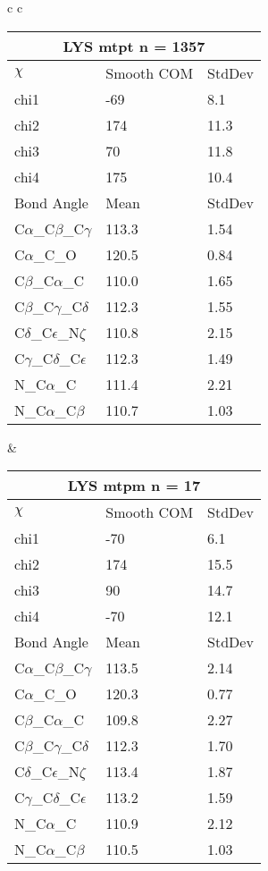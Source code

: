 \begin{longtable}{ c c }
  \begin{tabular}{ l l l }
  \toprule
  \multicolumn{3}{c}{LYS \textbf{mtpt} n = 1357} \\ \toprule
  $\chi$       & Smooth COM & StdDev \\ \midrule
  chi1 & -69 & 8.1 \\ 
  chi2 & 174 & 11.3 \\ 
  chi3 & 70 & 11.8 \\ 
  chi4 & 175 & 10.4 \\ \midrule
  Bond Angle   & Mean     & StdDev \\ \midrule
  C$\alpha$\_C$\beta$\_C$\gamma$ & 113.3 & 1.54\\
  C$\alpha$\_C\_O & 120.5 & 0.84\\
  C$\beta$\_C$\alpha$\_C & 110.0 & 1.65\\
  C$\beta$\_C$\gamma$\_C$\delta$ & 112.3 & 1.55\\
  C$\delta$\_C$\epsilon$\_N$\zeta$ & 110.8 & 2.15\\
  C$\gamma$\_C$\delta$\_C$\epsilon$ & 112.3 & 1.49\\
  N\_C$\alpha$\_C & 111.4 & 2.21\\
  N\_C$\alpha$\_C$\beta$ & 110.7 & 1.03\\
  \bottomrule
  \end{tabular}
  &
  \begin{tabular}{ l l l }
  \toprule
  \multicolumn{3}{c}{LYS \textbf{mtpm} n = 17} \\ \toprule
  $\chi$       & Smooth COM & StdDev \\ \midrule
  chi1 & -70 & 6.1 \\ 
  chi2 & 174 & 15.5 \\ 
  chi3 & 90 & 14.7 \\ 
  chi4 & -70 & 12.1 \\ \midrule
  Bond Angle   & Mean     & StdDev \\ \midrule
  C$\alpha$\_C$\beta$\_C$\gamma$ & 113.5 & 2.14\\
  C$\alpha$\_C\_O & 120.3 & 0.77\\
  C$\beta$\_C$\alpha$\_C & 109.8 & 2.27\\
  C$\beta$\_C$\gamma$\_C$\delta$ & 112.3 & 1.70\\
  C$\delta$\_C$\epsilon$\_N$\zeta$ & 113.4 & 1.87\\
  C$\gamma$\_C$\delta$\_C$\epsilon$ & 113.2 & 1.59\\
  N\_C$\alpha$\_C & 110.9 & 2.12\\
  N\_C$\alpha$\_C$\beta$ & 110.5 & 1.03\\

\end{tabular}
\end{longtable}
